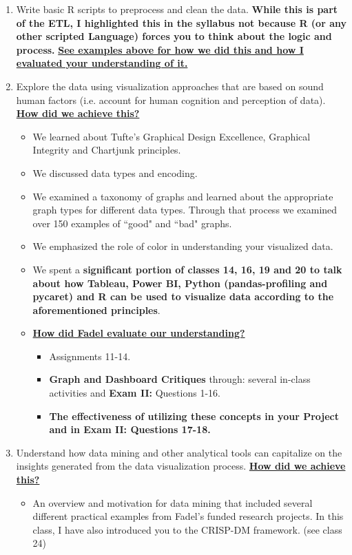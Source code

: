 \documentclass[letterpaper,12pt]{article}
\begin{document}
\begin{enumerate}[label=(\Alph*)]
\begin{itemize}[nosep]
	\end{itemize}
	\item Write basic R scripts to preprocess and clean the data. \textbf{While this is part of the ETL, I highlighted this in the syllabus not because \textbf{\textbf{R}} (or any other scripted Language) forces you to think about the logic and process.} \textbf{\ul{See examples above for how we did this and how I evaluated your understanding of it.}}
	\item Explore the data using visualization approaches that are based on sound human factors (i.e. account for human cognition and perception of data). \textbf{\ul{How did we achieve this?}}
	\begin{itemize}[nosep]
		\item We learned about Tufte's Graphical Design Excellence, Graphical Integrity and Chartjunk principles.
		\item We discussed data types and encoding. 
		\item We examined a taxonomy of graphs and learned about the appropriate graph types for different data types. Through that process we examined over 150 examples of ``good" and ``bad" graphs.
		\item We emphasized the role of color in understanding your visualized data. 
		\item We spent a \textbf{significant portion of classes 14, 16, 19 and 20 to talk about how Tableau, Power BI, Python (pandas-profiling and pycaret) and R can be used to visualize data according to the aforementioned principles}.
		\item \textbf{\ul{How did Fadel evaluate our understanding?}}
		\begin{itemize}
			\item Assignments 11-14.
			\item \textbf{Graph and Dashboard Critiques} through: several in-class activities and  \textbf{Exam II:} Questions 1-16.
			\item \textbf{The effectiveness of utilizing these concepts in your Project and in Exam II: Questions 17-18.}
		\end{itemize}
	\end{itemize}
	\item Understand how data mining and other analytical tools can capitalize on the insights generated from the data visualization process. \textbf{\ul{How did we achieve this?}}
	\begin{itemize}[nosep]
		\item An overview and motivation for data mining that included several different practical examples from Fadel's funded research projects. In this class, I have also introduced you to the CRISP-DM framework. (see class 24)

\end{itemize}
\end{enumerate}
\end{document}
